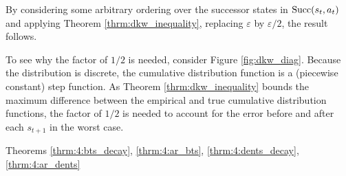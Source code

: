         \begin{proofoutline}
            By considering some arbitrary ordering over the successor states in ${\textnormal{Succ}(s_t,a_t)}$ and applying Theorem \ref{thrm:dkw_inequality}, replacing $\varepsilon$ by $\varepsilon/2$, the result follows.

            To see why the factor of $1/2$ is needed, consider Figure \ref{fig:dkw_diag}. Because the distribution is discrete, the cumulative distribution function is a (piecewise constant) step function. As Theorem \ref{thrm:dkw_inequality} bounds the maximum difference between the empirical and true cumulative distribution functions, the factor of $1/2$ is needed to account for the error before and after each $s_{t+1}$ in the worst case.

        \end{proofoutline}















         Theorems \ref{thrm:4:bts_decay}, \ref{thrm:4:ar_bts}, \ref{thrm:4:dents_decay}, \ref{thrm:4:ar_dents}
  











    




















